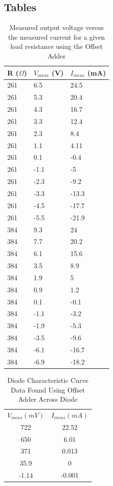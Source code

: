\documentclass{article}
\begin{document}
\subsection{Tables}
    \begin{table}[H]
        \centering
        \begin{tabular}{|l|l|l|}
             \hline
             \bf{R ($\Omega$)} & \bf{$V_{meas}$ (V)} & \bf{$I_{meas}$ (mA)}\\
             \hline
            261 & 6.5 & 24.5 \\
            261 & 5.3 & 20.4 \\
            261 & 4.3 & 16.7 \\
            261 & 3.3 & 12.4 \\
            261 & 2.3 & 8.4 \\
            261 & 1.1 & 4.11 \\
            261 & 0.1 & -0.4 \\
            261 & -1.1 & -5 \\
            261 & -2.3 & -9.2 \\
            261 & -3.3 & -13.3 \\
            261 & -4.5 & -17.7 \\
            261 & -5.5 & -21.9 \\
            384 & 9.3 & 24 \\
            384 & 7.7 & 20.2 \\
            384 & 6.1 & 15.6 \\
            384 & 3.5 & 8.9 \\
            384 & 1.9 & 5 \\
            384 & 0.9 & 1.2 \\
            384 & 0.1 & -0.1 \\
            384 & -1.1 & -3.2 \\
            384 & -1.9 & -5.3 \\
            384 & -3.5 & -9.6 \\
            384 & -6.1 & -16.7 \\
            384 & -6.9 & -18.2 \\
            \hline
        \end{tabular}
        \caption{Measured output voltage versus the measured current for a given load resistance using the Offset Adder}
        \label{tab:my_label}
    \end{table}
    \begin{table}[H]
\centering
\caption{Diode Characteristic Curve Data Found Using Offset Adder Across Diode}
\label{my-label}
\begin{tabular}{cc}
\textbf{$V_{meas} (mV)$} & \textbf{$I_{meas} (mA)$} \\
722 & 22.52 \\
650 & 6.01 \\
371 & 0.013 \\
35.9 & 0 \\
-1.14 & -0.001
\end{tabular}
\end{table}
\end{document}
